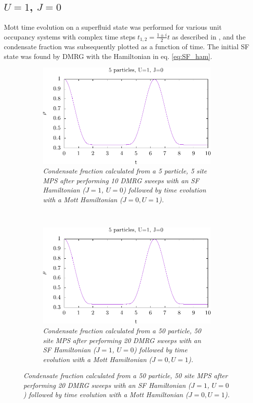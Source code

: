 \subsection{$U=1$, $J=0$}
Mott time evolution on a superfluid state was performed for various unit occupancy systems with complex time steps $t_{1,2}=\frac{1\pm i}{2}t$ as described in \cite{cmplx_t}, and the condensate fraction was subsequently plotted as a function of time. The initial SF state was found by DMRG with the Hamiltonian in eq. \ref{eq:SF_ham}.
\begin{figure}[h!]
    \centering
    \begin{subfigure}[t]{0.49\textwidth}
        \includegraphics[width=\textwidth]{Figures/TimeEvo5_U1_J0.pdf}
        \caption{\textit{Condensate fraction calculated from a 5 particle, 5 site MPS after performing 10 DMRG sweeps with an SF Hamiltonian ($J=1$, $U=0$) followed by time evolution with a Mott Hamiltonian ($J=0, U=1$).}}
        \label{fig:TimeEvo5_U1_J0}
    \end{subfigure}
    ~
    \begin{subfigure}[t]{0.49\textwidth}
        \includegraphics[width=\textwidth]{Figures/TimeEvo50_U1_J0.pdf}
        \caption{\textit{Condensate fraction calculated from a 50 particle, 50 site MPS after performing 20 DMRG sweeps with an SF Hamiltonian ($J=1$, $U=0$) followed by time evolution with a Mott Hamiltonian ($J=0, U=1$).}}
        \label{fig:TimeEvo50_U1_J0}
    \end{subfigure}    
\end{figure}
